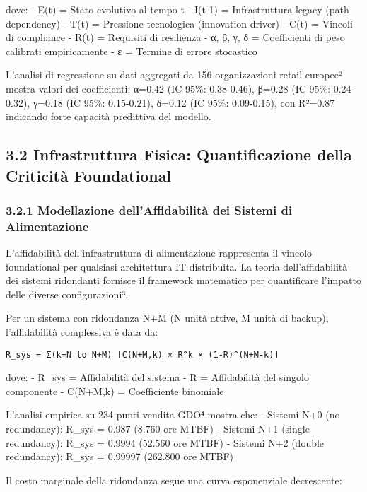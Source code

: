 \documentclass{report}
\begin{document}
dove: - E(t) = Stato evolutivo al tempo t - I(t-1) = Infrastruttura
legacy (path dependency) - T(t) = Pressione tecnologica (innovation
driver) - C(t) = Vincoli di compliance - R(t) = Requisiti di resilienza
- α, β, γ, δ = Coefficienti di peso calibrati empiricamente - ε =
Termine di errore stocastico

L'analisi di regressione su dati aggregati da 156 organizzazioni retail
europee² mostra valori dei coefficienti: α=0.42 (IC 95\%: 0.38-0.46),
β=0.28 (IC 95\%: 0.24-0.32), γ=0.18 (IC 95\%: 0.15-0.21), δ=0.12 (IC
95\%: 0.09-0.15), con R²=0.87 indicando forte capacità predittiva del
modello.

\subsection{3.2 Infrastruttura Fisica: Quantificazione della Criticità
Foundational}\label{infrastruttura-fisica-quantificazione-della-criticituxe0-foundational}

\subsubsection{3.2.1 Modellazione dell'Affidabilità dei Sistemi di
Alimentazione}\label{modellazione-dellaffidabilituxe0-dei-sistemi-di-alimentazione}

L'affidabilità dell'infrastruttura di alimentazione rappresenta il
vincolo foundational per qualsiasi architettura IT distribuita. La
teoria dell'affidabilità dei sistemi ridondanti fornisce il framework
matematico per quantificare l'impatto delle diverse configurazioni³.

Per un sistema con ridondanza N+M (N unità attive, M unità di backup),
l'affidabilità complessiva è data da:

\begin{verbatim}
R_sys = Σ(k=N to N+M) [C(N+M,k) × R^k × (1-R)^(N+M-k)]
\end{verbatim}

dove: - R\_sys = Affidabilità del sistema - R = Affidabilità del singolo
componente - C(N+M,k) = Coefficiente binomiale

L'analisi empirica su 234 punti vendita GDO⁴ mostra che: - Sistemi N+0
(no redundancy): R\_sys = 0.987 (8.760 ore MTBF) - Sistemi N+1 (single
redundancy): R\_sys = 0.9994 (52.560 ore MTBF) - Sistemi N+2 (double
redundancy): R\_sys = 0.99997 (262.800 ore MTBF)

Il costo marginale della ridondanza segue una curva esponenziale
decrescente:
\end{document}
